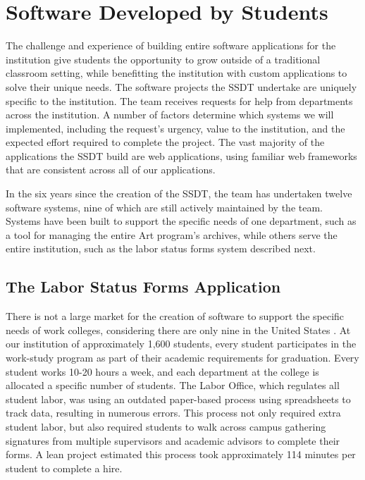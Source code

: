 \section{Software Developed by Students}

The challenge and experience of building entire software applications for the institution give students the opportunity to grow outside of a traditional classroom setting, while benefitting the institution with custom applications to solve their unique needs. The software projects the SSDT undertake are uniquely specific to the institution. The team receives requests for help from departments across the institution. A number of factors determine which systems we will implemented, including the request’s urgency, value to the institution, and the expected effort required to complete the project. The vast majority of the applications the SSDT build are web applications, using familiar web frameworks that are consistent across all of our applications.

In the six years since the creation of the SSDT, the team has undertaken twelve software systems, nine of which are still actively maintained by the team. Systems have been built to support the specific needs of one department, such as a tool for managing the entire Art program's archives, while others serve the entire institution, such as the labor status forms system described next.

\subsection{The Labor Status Forms Application}
There is not a large market for the creation of software to support the specific needs of work colleges, considering there are only nine in the United States \cite{WCCMembers, Ecclesia}. At our institution of approximately 1,600 students, every student participates in the work-study program as part of their academic requirements for graduation. Every student works 10-20 hours a week, and each department at the college is allocated a specific number of students. The Labor Office, which regulates all student labor, was using an outdated paper-based process using spreadsheets to track data, resulting in numerous errors. This process not only required extra student labor, but also required students to walk across campus gathering signatures from multiple supervisors and academic advisors to complete their forms. A lean project estimated this process took approximately 114 minutes per student to complete a hire.

